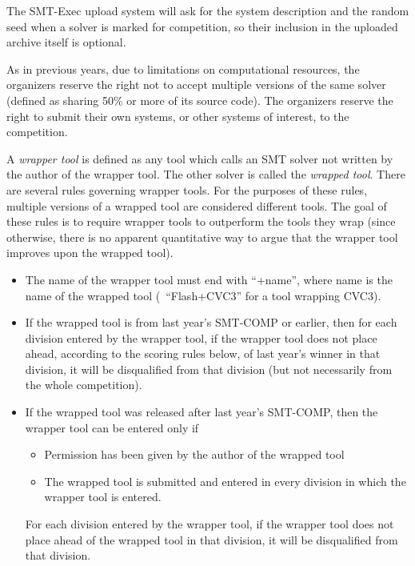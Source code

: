 \documentclass[12pt]{article}
\begin{document}
The SMT-Exec upload system will ask for the system description and
the random seed when a solver is marked for competition, so
their inclusion in the uploaded archive itself is optional.

As in previous years, due to limitations on
computational resources, the organizers reserve the right not to
accept multiple versions of the same solver (defined as sharing 50\%
or more of its source code).  The organizers reserve the right to
submit their own systems, or other systems of interest, to the
competition.

A \emph{wrapper tool} is defined as any tool
which calls an SMT solver not written by the author of the wrapper
tool.  The other solver is called the \emph{wrapped tool}.  There are
several rules governing wrapper tools.  For the purposes of these rules,
multiple versions of a wrapped tool are considered different tools.
The goal of these rules is to require wrapper tools to outperform the
tools they wrap (since otherwise, there is no apparent quantitative
way to argue that the wrapper tool improves upon the wrapped tool).

\begin{itemize}
\item The name of the wrapper tool must end with ``+name'', where name
is the name of the wrapped tool (\eg\ ``Flash+CVC3'' for a tool
wrapping CVC3).

\item If the wrapped tool is from last year's SMT-COMP or earlier, then for
each division entered by the wrapper tool, if the wrapper tool does not place ahead, according to the scoring
rules below, of last year's winner in that division, it will be disqualified
from that division (but not necessarily from the whole competition).

\item If the wrapped tool was released after last year's SMT-COMP,
then the wrapper tool can be entered only if

\begin{itemize}
\item Permission has been given by the author of the wrapped tool

\item The wrapped tool is submitted and entered in every division
      in which the wrapper tool is entered.
\end{itemize}

For each division entered by the wrapper tool, if the wrapper tool
does not place ahead of the wrapped tool in that division, it will be
disqualified from that division.
\end{itemize}
\end{document}
